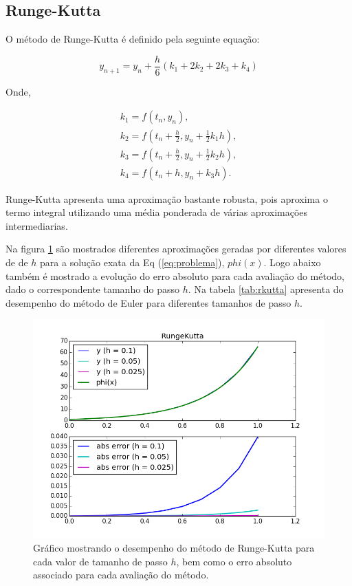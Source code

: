 \documentclass[a4paper]{article}
\begin{document}
\pagebreak

\subsection{Runge-Kutta}

O método de Runge-Kutta é definido pela seguinte equação:

\begin{equation}
\label{eq:rkutta}
y_{n+1} = y_n + \frac{h}{6}\left(k_1 + 2k_2 + 2k_3 + k_4 \right)
\end{equation}

Onde,

\begin{subequations}
\begin{align}
k_1 = f(t_n, y_n),
\\
k_2 = f(t_n + \tfrac{h}{2}, y_n + \tfrac{1}{2} k_1 h),
\\
k_3 = f(t_n + \tfrac{h}{2}, y_n + \tfrac{1}{2} k_2 h),
\\
k_4 = f(t_n + h, y_n + k_3 h).
\end{align}
\end{subequations}

Runge-Kutta apresenta uma aproximação bastante robusta, pois aproxima o termo integral utilizando uma média ponderada de várias aproximações intermediarias.

Na figura \ref{fig:rkutta} são mostrados diferentes aproximações geradas por diferentes valores de de $h$ para a solução exata da Eq (\ref{eq:problema}), $phi(x)$. Logo abaixo também é mostrado a evolução do erro absoluto para cada avaliação do método, dado o correspondente tamanho do passo $h$. Na tabela \ref{tab:rkutta} apresenta do desempenho do método de Euler para diferentes tamanhos de passo $h$.

\begin{figure}[!h]
\centering
\includegraphics[width=1.0\textwidth]{plots/RungeKutta.png}
\caption{\label{fig:rkutta}Gráfico mostrando o desempenho do método de Runge-Kutta para cada valor de tamanho de passo $h$, bem como o erro absoluto associado para cada avaliação do método.}
\end{figure}
\end{document}
